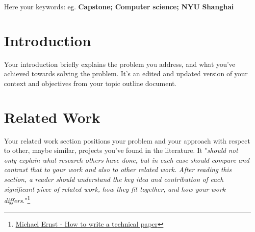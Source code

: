 \documentclass{scrartcl}
\begin{document}
\newpage


\begin{abstract}
	    A strong abstract sums up your work in very few sentences:
	    (i) state the problem you are addressing;
	    (ii) say why it’s an interesting problem, and which issues are hard to tackle; 
	    (iii) give your approach towards solving the problem; 
	    (iv) say why and how well your approach solves the problem.
\end{abstract}
\vspace{1cm}

\begin{keywords}
\centering
        Here your keywords: eg. \textbf{Capstone; Computer science; NYU Shanghai}
\end{keywords}

\newpage



\doublespacing
\tableofcontents
\singlespacing

\newpage

\doublespacing

\section{Introduction}

Your introduction briefly explains the problem you address, and what you've achieved towards solving the problem. It's an edited and updated version of your context and objectives from your topic outline document.

\section{Related Work}

Your related work section positions your problem and your approach with respect to other, maybe similar, projects you've found in the literature. 
It "\textit{should not only explain what research others have done, but in each case should compare and contrast that to your work and also to other related work. After reading this section, a reader should understand the key idea and contribution of each significant piece of related work, how they fit together, and how your work differs.}"\footnote{\href{https://homes.cs.washington.edu/~mernst/advice/write-technical-paper.html\#related-work}{Michael Ernst - How to write a technical paper}} 
\end{document}
